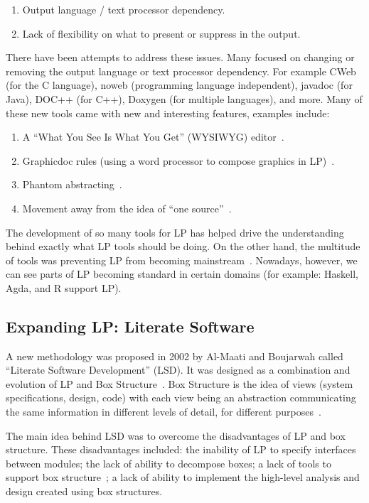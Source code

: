 \documentclass[preprint, 10pt]{sigplanconf}
\begin{document}
\begin{enumerate}
\item Output language / text processor dependency.
\item Lack of flexibility on what to present or suppress in the output.
\end{enumerate}

There have been attempts to address these issues. Many focused on changing or
removing the output language or text processor dependency. For example CWeb (for
the C language), noweb (programming language independent), javadoc (for Java),
DOC++ (for C++), Doxygen (for multiple languages), and more. Many of these new
tools came with new and interesting features, examples include:

\begin{enumerate}
\item A ``What You See Is What You Get'' (WYSIWYG)
editor~\cite{FritzsonGunnarssonAndJirstrand2002}.
\item Graphicdoc rules (using a word processor to compose graphics in
LP)~\cite{ShumAndCook1993}.
\item Phantom abstracting~\cite{ShumAndCook1993}.
\item Movement away from the idea of ``one source''~\cite{Simonis2003}.
\end{enumerate}

The development of so many tools for LP has helped drive the understanding
behind exactly what LP tools should be doing. On the other hand, the multitude
of tools was preventing LP from becoming mainstream~\cite{Ramsey1994}. Nowadays,
however, we can see parts of LP becoming standard in certain domains (for
example: Haskell, Agda, and R support LP).

\subsection{Expanding LP: Literate Software}

A new methodology was proposed in 2002 by Al-Maati and Boujarwah called
``Literate Software Development'' (LSD). It was designed as a combination and
evolution of LP and Box Structure~\cite{Mills1986}. Box Structure
is the idea of views (system specifications, design, code) with each view being
an abstraction communicating the same information in different levels of detail,
for different purposes~\cite{AlMatiiAndBoujarwah2002}.

The main idea behind LSD was to overcome the disadvantages of LP and box
structure. These disadvantages included: the inability of LP to specify
interfaces between modules; the lack of ability to decompose boxes; a lack of
tools to support box structure~\cite{Deck1996}; a lack of ability to implement
the high-level analysis and design created using box structures.
\end{document}
